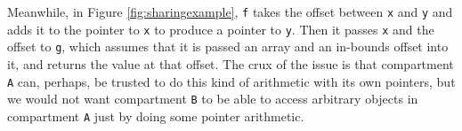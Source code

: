 \documentclass{article}
\begin{document}
%
  


Meanwhile, in Figure \ref{fig:sharingexample}, {\tt f} takes the offset between
{\tt x} and {\tt y} and adds it to the pointer to {\tt x} to produce a pointer to {\tt y}.
Then it passes {\tt x} and the offset to {\tt g}, which assumes that it is passed an array
and an in-bounds offset into it, and returns the value at that offset. The crux of the issue
is that compartment {\tt A} can, perhaps, be trusted to do this kind of arithmetic with its
own pointers, but we would not want compartment {\tt B} to be able to access arbitrary objects
in compartment {\tt A} just by doing some pointer arithmetic.
\end{document}
